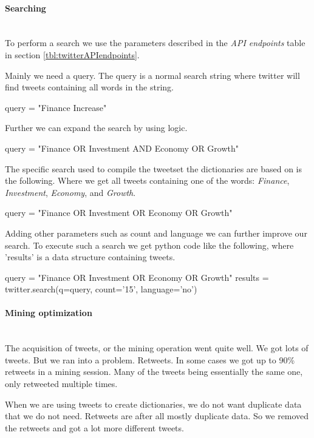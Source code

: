 \paragraph{Searching}
\hspace{0pt}\\
To perform a search we use the parameters described in the \textit{API
endpoints} table in section \ref{tbl:twitterAPIendpoints}.

Mainly we need a query. The query is a normal search string where twitter will
find tweets containing all words in the string. 
\begin{python}
query = "Finance Increase"
\end{python}

Further we can expand the search by using logic. 
\begin{python}
query = "Finance OR Investment AND Economy OR Growth"
\end{python}

The specific search used to compile the tweetset the dictionaries are based on is the
following. Where we get all tweets containing one of the words: \textit{Finance}, \textit{Investment}, \textit{Economy}, and \textit{Growth}.
\begin{python}
query = "Finance OR Investment OR Economy OR Growth"
\end{python}

Adding other parameters such as count and language we can further improve our
search. To execute such a search we get python code like the following, where
'results' is a data structure containing tweets.
\begin{python}
query = "Finance OR Investment OR Economy OR Growth"
results = twitter.search(q=query, count='15', language='no')
\end{python}
%

\paragraph{Mining optimization}
\hspace{0pt}\\
The acquisition of tweets, or the mining operation went quite well. We got lots
of tweets. But we ran into a problem. Retweets. In some cases we got up to 90\%
retweets in a mining session. Many of the tweets being essentially the same
one, only retweeted multiple times. 

When we are using tweets to create dictionaries, we do not want duplicate data
that we do not need. Retweets are after all mostly duplicate data. So we removed
the retweets and got a lot more different tweets. 

